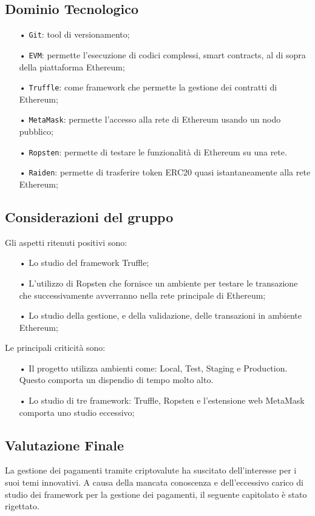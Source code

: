 \subsection{Dominio Tecnologico}
\begin{itemize}

\item[•] \texttt{Git}: tool di versionamento;
\item[•] \texttt{EVM}: permette l’esecuzione di codici complessi, smart contracts, al di sopra della piattaforma Ethereum;
\item[•] \texttt{Truffle}: come framework che permette la gestione dei contratti di Ethereum;
\item[•] \texttt{MetaMask}: 
permette l'accesso alla rete di Ethereum usando un nodo pubblico; 
\item[•] \texttt{Ropsten}: permette di testare le funzionalità di Ethereum su una rete. 
\item[•] \texttt{Raiden}: permette di trasferire token ERC20 quasi istantaneamente alla rete Ethereum;  

\end{itemize}

\subsection{Considerazioni del gruppo}

Gli aspetti ritenuti positivi sono: 
\begin{itemize}

\item[•] Lo studio del framework Truffle;
\item[•] L'utilizzo di Ropsten che fornisce un ambiente per testare le transazione che successivamente avverranno nella rete principale di Ethereum;
\item[•] Lo studio della gestione, e della validazione, delle transazioni in ambiente Ethereum; 

\end{itemize}

Le principali criticità sono: 
\begin{itemize}

\item[•] Il progetto utilizza ambienti come: Local, Test, Staging e Production. Questo comporta un dispendio di tempo molto alto. 

\item[•] Lo studio di tre framework: Truffle, Ropsten e l'estensione web MetaMask comporta uno studio eccessivo;

\end{itemize}


\subsection{Valutazione Finale}
La gestione dei pagamenti tramite criptovalute ha suscitato dell'interesse per i suoi temi innovativi. 
A causa della mancata conoscenza e dell'eccessivo carico di studio dei framework per la gestione dei pagamenti, il seguente capitolato è stato rigettato. 